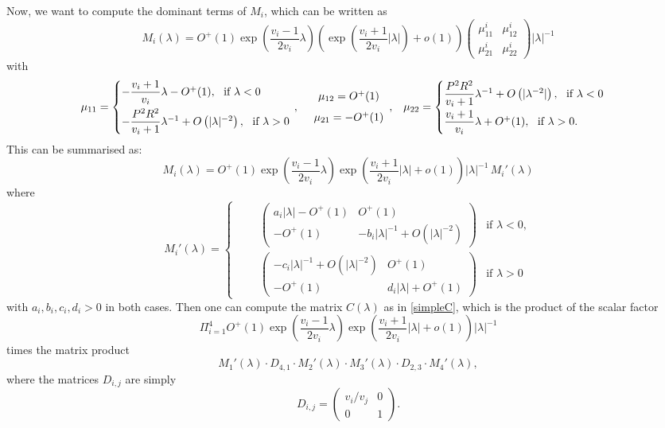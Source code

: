\documentclass[a4paper]{article}
\numberwithin{equation}{section}
\begin{document}
Now, we want to compute the dominant terms of $M_i$, which can be written as
 $$M_i(\lambda)=O^+(1)\exp\left(\dfrac{v_i-1}{2v_i}\lambda\right)\left( \exp\left( \dfrac{v_i+1}{2v_i}|\lambda| \right) +o(1)  \right)
 \begin{pmatrix} \mu_{11}^i&\mu_{12}^i\\\mu_{21}^i&\mu_{22}^i\end{pmatrix}|\lambda|^{-1}$$
with
\[
\begin{array}{ccc}%
\mu_{11} =
\begin{cases}
-\dfrac{v_i+1}{v_i}\lambda - O^+(1), \ \textrm{ if }\lambda<0\\[0.75em]
-\dfrac{P^2R^2}{v_i+1}\lambda^{-1} + O\left( |\lambda|^{-2}\right), \ \textrm{ if }  \lambda>0
\end{cases}\hspace{-0.3cm},
&
\begin{array}{c}
\mu_{12}=O^+(1)\\[0.7em]
\mu_{21}=-O^+(1)
\end{array},
&
\mu_{22} =
\begin{cases}
\dfrac{P^2R^2}{v_i+1}\lambda^{-1} + O\left( |\lambda^{-2}|\right), \ \textrm{ if } \lambda<0\\[0.75em]
\dfrac{v_i+1}{v_i}\lambda + O^+(1), \ \textrm{ if }  \lambda>0.
\end{cases}
\end{array}
\]
This can be summarised as:
\[
M_i(\lambda) =
O^+(1)\exp\left(\dfrac{v_i-1}{2v_i}\lambda\right)\exp\left(\dfrac{v_i+1}{2v_i}|\lambda| + o(1)\right)|\lambda|^{-1}\,M_i'(\lambda)
\]
where
\[
M_i'(\lambda) =
\begin{cases}
 \qquad\begin{pmatrix} a_i|\lambda|-O^+(1)& O^+(1)\\ -O^+(1) & -b_i|\lambda|^{-1}+ O(|\lambda|^{-2})\end{pmatrix} &\textrm{if }\lambda<0,\\[1.25em]
 \qquad\begin{pmatrix} -c_i |\lambda|^{-1} +O(|\lambda|^{-2})& O^+(1)\\ -O^+(1) & d_i |\lambda| +O^+(1)\end{pmatrix}  &\textrm{if }\lambda>0
\end{cases}
\]
with $a_i,b_i, c_i,d_i>0$ in both cases.
Then one can compute the matrix $C(\lambda)$ as in \eqref{simpleC}, which is the product of the scalar factor
$$\Pi_{i=1}^4 O^+(1)\exp\left(\dfrac{v_i-1}{2v_i}\lambda\right) \exp\left(\dfrac{v_i+1}{2v_i}|\lambda| + o(1)\right) |\lambda|^{-1}$$
times the matrix product
$$
M_1'(\lambda)\cdot
D_{4,1}\cdot
M_2'(\lambda)\cdot M_3'(\lambda)\cdot D_{2,3}\cdot
M_4'(\lambda),$$
where the matrices $D_{i,j}$ are simply
$$
D_{i,j}=\begin{pmatrix} v_i/v_j& 0 \\0&1\end{pmatrix}.
 $$
\end{document}
